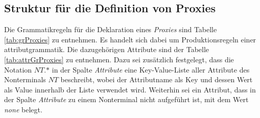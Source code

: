\subsection{Struktur für die Definition von Proxies}\label{sec:proxygram}
Die Grammatikregeln für die Deklaration eines \emph{Proxies} sind Tabelle \ref{tab:grProxies} zu entnehmen. Es handelt sich dabei um Produktionsregeln einer \Gls{attributgrammatik}. Die dazugehörigen Attribute sind der Tabelle \ref{tab:attrGrProxies} zu entnehmen. Dazu sei zusätzlich festgelegt, dass die Notation $\mathit{NT}\texttt{.}\text{*}$ in der Spalte \emph{Attribute} eine Key-Value-Liste aller Attribute des Nonterminals $\mathit{NT}$ beschreibt, wobei der Attributname als Key und dessen Wert als Value innerhalb der Liste verwendet wird. Weiterhin sei ein Attribut, dass in der Spalte \emph{Attribute} zu einem Nonterminal nicht aufgeführt ist, mit dem Wert \emph{none} belegt.
\newpage
